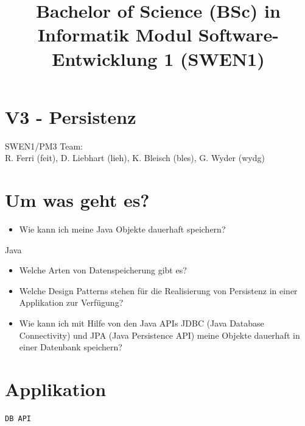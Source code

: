 \documentclass[10pt]{article}
\title{Bachelor of Science (BSc) in Informatik Modul Software-Entwicklung 1 (SWEN1) }
\author{}
\date{}
\begin{document}
\maketitle
\section*{V3 - Persistenz}
SWEN1/PM3 Team:\\
R. Ferri (feit), D. Liebhart (lieh), K. Bleisch (bles), G. Wyder (wydg)

\section*{Um was geht es?}
\begin{itemize}
  \item Wie kann ich meine Java Objekte dauerhaft speichern?
\end{itemize}

Java

\begin{itemize}
  \item Welche Arten von Datenspeicherung gibt es?
  \item Welche Design Patterns stehen für die Realisierung von Persistenz in einer Applikation zur Verfügung?
  \item Wie kann ich mit Hilfe von den Java APIs JDBC (Java Database Connectivity) und JPA (Java Persistence API) meine Objekte dauerhaft in einer Datenbank speichern?
\end{itemize}

\section*{Applikation}
\begin{verbatim}
DB API
\end{verbatim}
\end{document}
